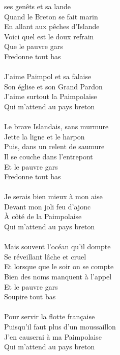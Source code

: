 
 ses genêts et sa lande
\\Quand le Breton se fait marin
\\En allant aux pêches d'Islande
\\Voici quel est le doux refrain
\\Que le pauvre gars
\\Fredonne tout bas
\\\\J'aime Paimpol et sa falaise
\\Son église et son Grand Pardon
\\J'aime surtout la Paimpolaise
\\Qui m'attend au pays breton
\\\\Le brave Islandais, sans murmure
\\Jette la ligne et le harpon
\\Puis, dans un relent de saumure
\\Il se couche dans l'entrepont
\\Et le pauvre gars
\\Fredonne tout bas
\\\\Je serais bien mieux à mon aise
\\Devant mon joli feu d'ajonc
\\À côté de la Paimpolaise
\\Qui m'attend au pays breton
\\\\Mais souvent l'océan qu'il dompte
\\Se réveillant lâche et cruel
\\Et lorsque que le soir on se compte
\\Bien des noms manquent à l'appel
\\Et le pauvre gars
\\Soupire tout bas
\\\\Pour servir la flotte française
\\Puisqu'il faut plus d'un moussaillon
\\J'en causerai à ma Paimpolaise
\\Qui m'attend au pays breton
\breakpage